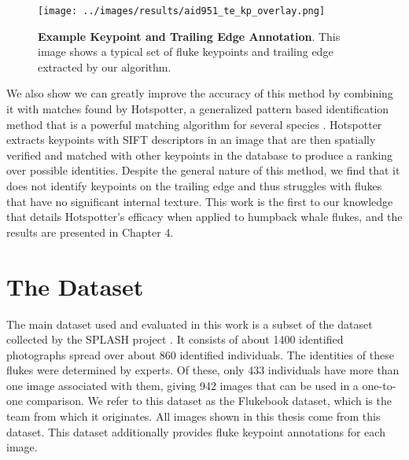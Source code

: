 
\begin{figure}[t]%
\centering
\texttt{[image: ../images/results/aid951\_te\_kp\_overlay.png]}
\caption{\textbf{Example Keypoint and Trailing Edge Annotation}. This image shows a typical set of fluke keypoints and trailing edge extracted by our algorithm.}
\label{fig:example_overlay}
\end{figure}

We also show we can greatly improve the accuracy of this method by combining it with matches found by Hotspotter, a generalized pattern based identification method that is a powerful matching algorithm for several species \cite{crall_hotspotter_2013}.
Hotspotter extracts keypoints with SIFT descriptors \cite{lowe2004distinctive} in an image that are then spatially verified and matched with other keypoints in the database to produce a ranking over possible identities. 
Despite the general nature of this method, we find that it does not identify keypoints on the trailing edge and thus struggles with flukes that have no significant internal texture. 
This work is the first to our knowledge that details Hotspotter's efficacy when applied to humpback whale flukes, and the results are presented in Chapter 4.

\section{The Dataset}

The main dataset used and evaluated in this work is a subset of the dataset collected by the SPLASH project \cite{calambokidis2008splash}. 
It consists of about 1400 identified photographs spread over about 860 identified individuals.
The identities of these flukes were determined by experts.
Of these, only 433 individuals have more than one image associated with them, giving 942 images that can be used in a one-to-one comparison.
We refer to this dataset as the Flukebook dataset, which is the team from which it originates.
All images shown in this thesis come from this dataset.
This dataset additionally provides fluke keypoint annotations for each image.

